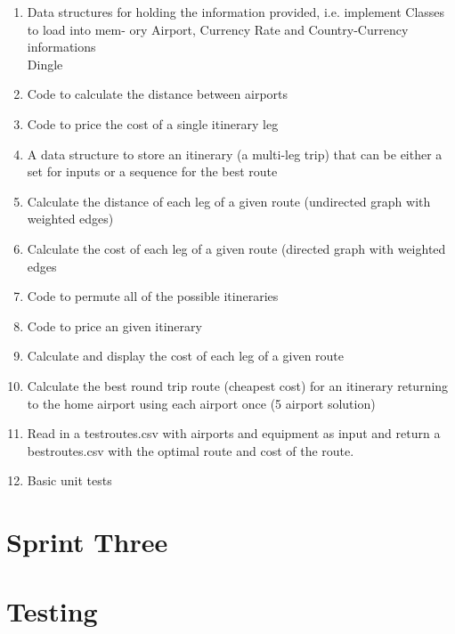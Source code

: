 \documentclass[oneside]{article}
\begin{document}
\begin{enumerate}
	
\item Data structures for holding the information provided, i.e. implement Classes to load into mem- ory  Airport,  Currency  Rate  and  Country-Currency informations\\

Dingle
\item Code to calculate the distance between airports

\item Code to price the cost of a single itinerary leg

\item A data structure to store an itinerary (a multi-leg trip) that can be either a set for inputs or a sequence for the best route

\item Calculate  the  distance  of  each  leg  of  a  given route (undirected graph with weighted edges)

\item Calculate the cost of each leg of a given route (directed graph with weighted edges

\item Code to permute all of the possible itineraries

\item Code to price an given itinerary

\item Calculate and display the cost of each leg of a given route

\item Calculate  the  best  round  trip  route  (cheapest cost) for an itinerary returning to the home airport using each airport once (5 airport solution)

\item Read in a testroutes.csv with airports and equipment as input and return a bestroutes.csv with the optimal route and cost of the route.

\item Basic unit tests
\end{enumerate}

\section{Sprint Three}



\section{Testing}
\end{document}
